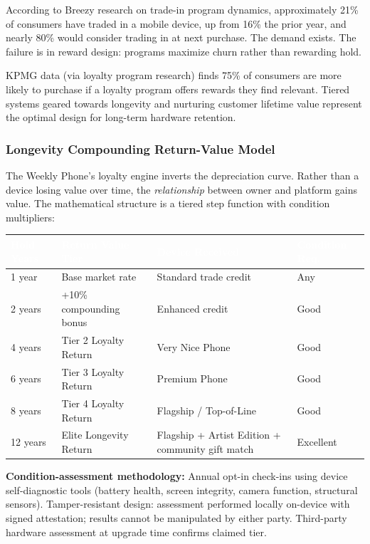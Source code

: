 \documentclass[11pt,letterpaper]{article}
\newcommand{\tableheader}[1]{\textbf{\sffamily\textcolor{white}{#1}}}
\begin{document}
According to Breezy research on trade-in program dynamics, approximately 21\% of consumers have traded in a mobile device, up from 16\% the prior year, and nearly 80\% would consider trading in at next purchase. The demand exists. The failure is in reward design: programs maximize churn rather than rewarding hold.

KPMG data (via loyalty program research) finds 75\% of consumers are more likely to purchase if a loyalty program offers rewards they find relevant. Tiered systems geared towards longevity and nurturing customer lifetime value represent the optimal design for long-term hardware retention.

\subsubsection{Longevity Compounding Return-Value Model}

The Weekly Phone's loyalty engine inverts the depreciation curve. Rather than a device losing value over time, the \textit{relationship} between owner and platform gains value. The mathematical structure is a tiered step function with condition multipliers:

\begin{center}
\begin{tabularx}{\textwidth}{C{2cm}XC{3cm}C{2.5cm}}
\toprule
{}
\tableheader{Hold Years} & \tableheader{Return Value Tier} & \tableheader{Device Received} & \tableheader{Condition Req.} \\
 year & Base market rate & Standard trade credit & Any \\
2 years & +10\% compounding bonus & Enhanced credit & Good \\
4 years & Tier 2 Loyalty Return & Very Nice Phone & Good \\
6 years & Tier 3 Loyalty Return & Premium Phone & Good \\
8 years & Tier 4 Loyalty Return & Flagship / Top-of-Line & Good \\
12 years & Elite Longevity Return & Flagship + Artist Edition + community gift match & Excellent \\
\bottomrule
\end{tabularx}
\end{center}

\textbf{Condition-assessment methodology:} Annual opt-in check-ins using device self-diagnostic tools (battery health, screen integrity, camera function, structural sensors). Tamper-resistant design: assessment performed locally on-device with signed attestation; results cannot be manipulated by either party. Third-party hardware assessment at upgrade time confirms claimed tier.
\end{document}
